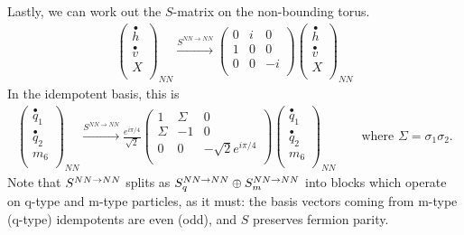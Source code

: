Lastly, we can work out the $S$-matrix on the non-bounding torus.
\begin{align}
\left( \begin{matrix}
\stackrel{\bullet}{h} \\
\stackrel{\bullet}{v} \\
X \\
\end{matrix} \right)_{NN}
\xrightarrow{S^{NN\rightarrow NN}} 
\left( \begin{matrix}
0&i  &0 \\ 
1&0 &0 \\
0&0& -i \\
\end{matrix} \right)
\left( \begin{matrix}
\stackrel{\bullet}{h} \\
\stackrel{\bullet}{v} \\
X \\\end{matrix} \right)_{NN}
\end{align}
In the idempotent basis, this is
\begin{align}   \label{hE6_S_NN}
\left( \begin{matrix}
\stackrel{\bullet}{q}_{1}\\
\stackrel{\bullet}{q}_{2}\\
{m}_6 \\ 
\end{matrix} \right)_{NN}
 \xrightarrow{S^{NN \rightarrow NN}}
\frac{e^{i \pi /4}}{\sqrt{2}}\left( \begin{matrix} 
1&\Sigma &0 \\
\Sigma &-1&0\\
0&0& -\sqrt{2} e^{i \pi /4}\\
\end{matrix} \right)
\left( \begin{matrix}
\stackrel{\bullet}{q}_{1}\\
\stackrel{\bullet}{q}_{2}\\
{m}_6 \\ 
\end{matrix} \right)_{NN}
\quad \quad \text{where $\Sigma = \sigma_1 \sigma_2$.}
\end{align}
Note that $S^{NN\rightarrow NN}$ splits as $S^{NN\rightarrow NN}_q \oplus S^{NN\rightarrow NN}_m$ into blocks which operate 
on q-type and m-type particles, as it must: 
the basis vectors coming from m-type (q-type) idempotents are even (odd), and $S$ preserves fermion parity.

